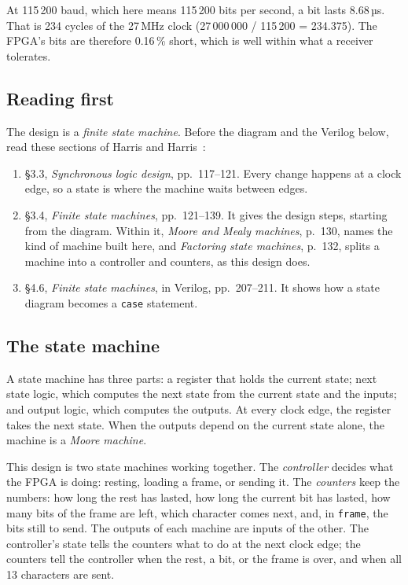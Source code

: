 \documentclass[11pt,a4paper]{article}
\begin{document}
At 115\,200 baud, which here means 115\,200 bits per second, a bit lasts 8.68\,µs. That is 234 cycles of the 27\,MHz clock (27\,000\,000 / 115\,200 = 234.375). The FPGA’s bits are therefore 0.16\,\% short, which is well within what a receiver tolerates.

\subsection*{Reading first}

The design is a \emph{finite state machine}. Before the diagram and the Verilog below, read these sections of Harris and Harris~\cite{ddca}:
\begin{enumerate}
  \item §3.3, \emph{Synchronous logic design}, pp.~117--121. Every change happens at a clock edge, so a state is where the machine waits between edges.
  \item §3.4, \emph{Finite state machines}, pp.~121--139. It gives the design steps, starting from the diagram. Within it, \emph{Moore and Mealy machines}, p.~130, names the kind of machine built here, and \emph{Factoring state machines}, p.~132, splits a machine into a controller and counters, as this design does.
  \item §4.6, \emph{Finite state machines}, in Verilog, pp.~207--211. It shows how a state diagram becomes a \texttt{case} statement.
\end{enumerate}

\subsection*{The state machine}

A state machine has three parts: a register that holds the current state; next state logic, which computes the next state from the current state and the inputs; and output logic, which computes the outputs. At every clock edge, the register takes the next state. When the outputs depend on the current state alone, the machine is a \emph{Moore machine}.

This design is two state machines working together. The \emph{controller} decides what the FPGA is doing: resting, loading a frame, or sending it. The \emph{counters} keep the numbers: how long the rest has lasted, how long the current bit has lasted, how many bits of the frame are left, which character comes next, and, in \texttt{frame}, the bits still to send. The outputs of each machine are inputs of the other. The controller’s state tells the counters what to do at the next clock edge; the counters tell the controller when the rest, a bit, or the frame is over, and when all 13 characters are sent.
\end{document}
